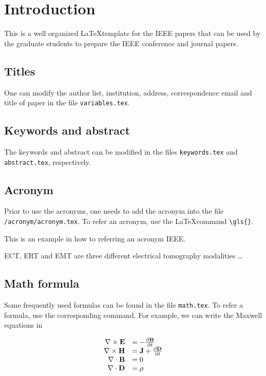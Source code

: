 

\section{Introduction}
\label{sec:introduction}

This is a well organized \LaTeX  template for the IEEE papers that can be used by  the graduate students to prepare the IEEE conference and journal papers.



\subsection{Titles}

One can modify the author list, institution, address, correspondence email and title of paper in the file \verb+variables.tex+.


\subsection{Keywords and abstract}
The keywords and abstract can be modified in the files \verb+keywords.tex+ and \verb+abstract.tex+, respectively.


\subsection{Acronym}

Prior to use the acronyms, one needs to add the acronym into the file \verb+/acronym/acronym.tex+.
To refer an acronym, use the \LaTeX  command \verb+\gls{}+.

This is an example in how to referring an acronym \gls{IEEE}.

\gls{ECT}, \gls{ERT} and \gls{EMT} are three different electrical tomography modalities \ldots


\subsection{Math formula}

Some frequently used formulas can be found in the file \verb+math.tex+.
To refer a formula, use the corresponding command.
For example, we can write the Maxwell equations in

\begin{equation}\label{eq:maxwell}
  \begin{array}{rl} \nabla\times {\mathbf{E}}&=-\frac{\partial {\mathbf{B}}}{\partial t} \\ \nabla\times {\mathbf{H}}&={\mathbf{J}}+\frac{\partial {\mathbf{D}}}{\partial t} \\ \nabla\cdot {\mathbf{B}}&=0 \\ \nabla\cdot {\mathbf{D}}&=\rho \\ \end{array}
\end{equation}

